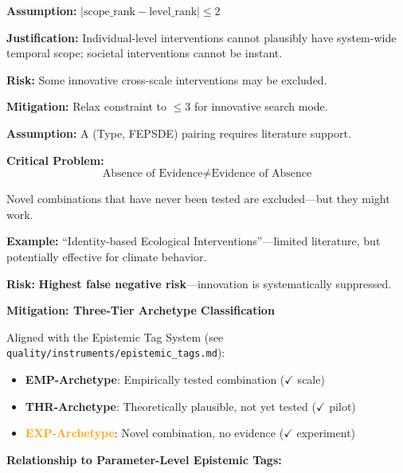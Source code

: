 \begin{tcolorbox}[colback=yellow!5!white, colframe=yellow!75!black,
    title=\textbf{Assumption A4: Scale Coherence}]
\textbf{Assumption:} $|\text{scope\_rank} - \text{level\_rank}| \leq 2$

\textbf{Justification:} Individual-level interventions cannot plausibly have system-wide temporal scope; societal interventions cannot be instant.

\textbf{Risk:} Some innovative cross-scale interventions may be excluded.

\textbf{Mitigation:} Relax constraint to $\leq 3$ for innovative search mode.
\end{tcolorbox}

\begin{tcolorbox}[colback=red!5!white, colframe=red!75!black,
    title=\textbf{Assumption A5: Empirical Evidence Requirement} $\triangleright$ \textit{Highest Risk}]
\textbf{Assumption:} A (Type, FEPSDE) pairing requires literature support.

\textbf{Critical Problem:}
\begin{equation}
\text{Absence of Evidence} \neq \text{Evidence of Absence}
\end{equation}

Novel combinations that have never been tested are excluded---but they might work.

\textbf{Example:} ``Identity-based Ecological Interventions''---limited literature, but potentially effective for climate behavior.

\textbf{Risk:} \textbf{Highest false negative risk}---innovation is systematically suppressed.

\textbf{Mitigation: Three-Tier Archetype Classification}

Aligned with the Epistemic Tag System (see \texttt{quality/instruments/epistemic\_tags.md}):

\begin{itemize}[nosep]
\item \textcolor{green!60!black}{\textbf{EMP-Archetype}}: Empirically tested combination ($\checkmark$ scale)
\item \textcolor{blue!60!black}{\textbf{THR-Archetype}}: Theoretically plausible, not yet tested ($\checkmark$ pilot)
\item \textcolor{orange}{\textbf{EXP-Archetype}}: Novel combination, no evidence ($\checkmark$ experiment)
\end{itemize}

\medskip
\textbf{Relationship to Parameter-Level Epistemic Tags:}


\end{tcolorbox}
